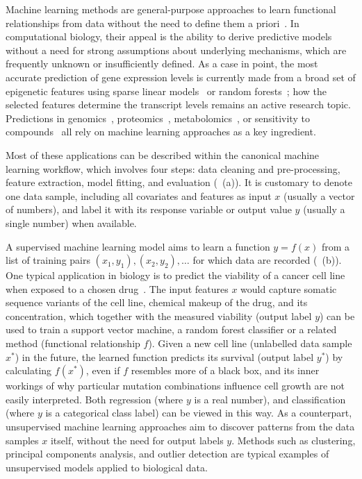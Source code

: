 Machine learning methods are general-purpose approaches to learn functional relationships from data without the need to define them a priori~\citep{hastie_elements_2005,michalski_machine_2013,murphy_machine_2012}. In computational biology, their appeal is the ability to derive predictive models without a need for strong assumptions about underlying mechanisms, which are frequently unknown or insufficiently defined. As a case in point, the most accurate prediction of gene expression levels is currently made from a broad set of epigenetic features using sparse linear models~\citep{cheng_statistical_2011,karlic_histone_2010} or random forests~\citep{li_using_2015}; how the selected features determine the transcript levels remains an active research topic. Predictions in genomics~\citep{libbrecht_machine_2015,martens_predicting_2016}, proteomics~\citep{swan_application_2013}, metabolomics~\citep{kell_metabolomics_2005}, or sensitivity to compounds~\citep{eduati_prediction_2015} all rely on machine learning approaches as a key ingredient.

Most of these applications can be described within the canonical machine learning workflow, which involves four steps: data cleaning and pre-processing, feature extraction, model fitting, and evaluation (~(a)). It is customary to denote one data sample, including all covariates and features as input $x$ (usually a vector of numbers), and label it with its response variable or output value $y$ (usually a single number) when available.

A supervised machine learning model aims to learn a function $y=f(x)$ from a list of training pairs $(x_1,y_1), (x_2,y_2),\ldots$ for which data are recorded (~(b)). One typical application in biology is to predict the viability of a cancer cell line when exposed to a chosen drug~\citep{eduati_prediction_2015,menden_machine_2013}. The input features $x$ would capture somatic sequence variants of the cell line, chemical makeup of the drug, and its concentration, which together with the measured viability (output label $y$) can be used to train a support vector machine, a random forest classifier or a related method (functional relationship $f$). Given a new cell line (unlabelled data sample $x^*$) in the future, the learned function predicts its survival (output label $y^*$) by calculating $f(x^*)$, even if $f$ resembles more of a black box, and its inner workings of why particular mutation combinations influence cell growth are not easily interpreted. Both regression (where $y$ is a real number), and classification (where $y$ is a categorical class label) can be viewed in this way. As a counterpart, unsupervised machine learning approaches aim to discover patterns from the data samples $x$ itself, without the need for output labels $y$. Methods such as clustering, principal components analysis, and outlier detection are typical examples of unsupervised models applied to biological data.

